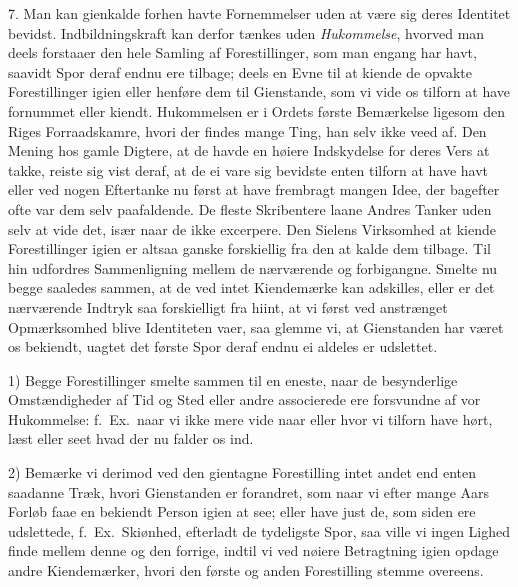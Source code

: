 \documentclass[12pt,a4paper]{article}
\newcommand{\opage}[1]{\marginnote{\footnotesize\textit{[#1]}}}
\begin{document}
7. Man kan gienkalde forhen havte Fornemmelser uden at være sig deres Identitet bevidst.
Indbildningskraft kan derfor tænkes uden \emph{Hukommelse}, hvorved man deels forstaaer
den hele Samling af Forestillinger, som man engang har havt, saavidt Spor deraf endnu ere
tilbage; deels en Evne til at kiende de opvakte Forestillinger igien eller henføre dem
til Gienstande, som vi vide os tilforn at have fornummet eller kiendt. Hukommelsen er i
Ordets første Bemærkelse ligesom den Riges Forraadskamre, hvori der findes mange Ting,
han selv ikke veed af. Den Mening hos gamle Digtere, at de havde en høiere Indskydelse
for deres Vers at takke, reiste sig vist deraf, at de ei vare sig bevidste enten tilforn
at have havt eller ved nogen Eftertanke nu først at have frembragt mangen Idee, der
bagefter ofte var dem selv paafaldende. De fleste Skribentere laane Andres Tanker uden
selv at vide det, især naar de ikke excerpere. Den Sielens Virksomhed at kiende
Forestillinger igien er altsaa ganske forskiellig fra den at kalde dem tilbage. Til hin
udfordres Sammenligning mellem de nærværende og forbigangne. Smelte nu begge saaledes
sammen, at de ved intet Kiendemærke kan adskilles, eller er det nærværende Indtryk saa
forskielligt fra hiint, at
\opage{109} vi først ved anstrænget Opmærksomhed blive Identiteten vaer, saa glemme vi, at
Gienstanden har været os bekiendt, uagtet det første Spor deraf endnu ei aldeles er
udslettet.

1) Begge Forestillinger smelte sammen til en eneste, naar de besynderlige Omstændigheder
af Tid og Sted eller andre associerede ere forsvundne af vor Hukommelse: f.~Ex.\ naar vi
ikke mere vide naar eller hvor vi tilforn have hørt, læst eller seet hvad der nu falder
os ind.

2) Bemærke vi derimod ved den gientagne Forestilling intet andet end enten saadanne Træk,
hvori Gienstanden er forandret, som naar vi efter mange Aars Forløb faae en bekiendt
Person igien at see; eller have just de, som siden ere udslettede, f.~Ex.\ Skiønhed,
efterladt de tydeligste Spor, saa ville vi ingen Lighed finde mellem denne og den forrige,
indtil vi ved nøiere Betragtning igien opdage andre Kiendemærker, hvori den første og
anden Forestilling stemme overeens.
\end{document}
